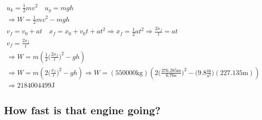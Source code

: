 \documentclass{article}
\begin{document}
\begin{align*}
    u_k=\frac{1}{2}mv^2 \quad u_g=mgh \\
    \Longrightarrow W=\frac{1}{2}mv^2-mgh \\
    v_f=v_0+at 
    \quad x_f=x_0+v_0t+at^2 \Longrightarrow x_f=\frac{1}{2}at^2 \Longrightarrow \frac{2x_f}{t}=at \\
    v_f=\frac{2x_f}{t} \\
    \Longrightarrow W=m(\frac{1}{2}\biggr(\frac{2x_f}{t}\biggr)^2-gh) \\
    \Longrightarrow W=m(2\biggr(\frac{x_f}{t}\biggr)^2-gh)
    \Longrightarrow W=(550000\text{kg})(2\biggr(\frac{376.285\text{m}}{6.76\text{s}}\biggr)^2-\biggr(9.8\frac{\text{m}}{\text{s}^2}\biggr)(227.135\text{m})) \\
    \Longrightarrow 2184004499 \text{J}
\end{align*}
\subsection{How fast is that engine going?}
\end{document}
